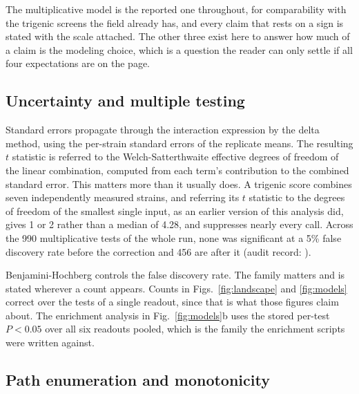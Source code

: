  The multiplicative model is the reported one
throughout, for comparability with the trigenic screens the field already has, and every
claim that rests on a sign is stated with the scale attached. The other three exist here to
answer how much of a claim is the modeling choice, which is a question the reader can only
settle if all four expectations are on the page.

\subsection*{Uncertainty and multiple testing}

Standard errors propagate through the interaction expression by the delta method, using the
per-strain standard errors of the replicate means. The resulting $t$ statistic is referred
to the Welch-Satterthwaite effective degrees of freedom of the linear combination, computed
from each term's contribution to the combined standard error. This matters more than it
usually does. A trigenic score combines seven independently measured strains, and referring
its $t$ statistic to the degrees of freedom of the smallest single input, as an earlier
version of this analysis did, gives 1 or 2 rather than a median of 4.28, and suppresses
nearly every call. Across the 990 multiplicative tests of the whole run, none was
significant at a 5\% false discovery rate before the correction and 456 are after it
(audit record: ).

Benjamini-Hochberg controls the false discovery rate. The family matters and is stated
wherever a count appears. Counts in Figs.~\ref{fig:landscape} and \ref{fig:models} correct
over the tests of a single readout, since that is what those figures claim about. The
enrichment analysis in Fig.~\ref{fig:models}b uses the stored per-test $P < 0.05$ over all
six readouts pooled, which is the family the enrichment scripts were written against.

\subsection*{Path enumeration and monotonicity}

